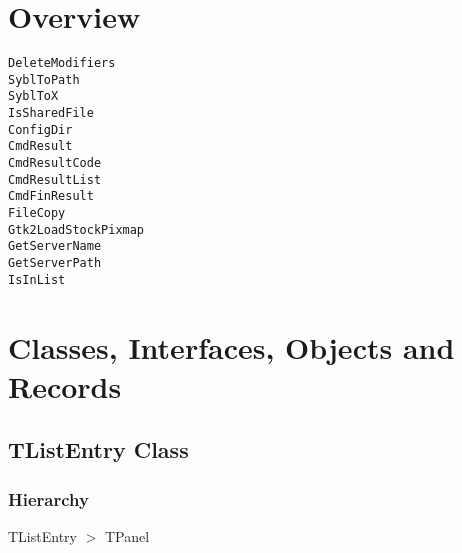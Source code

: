 \documentclass{report}
\newif\ifpdf
\begin{document}
\section{Overview}
\begin{description}
\item[\texttt{\begin{ttfamily}TListEntry\end{ttfamily} Class}]
\end{description}
\begin{description}
\item[\texttt{DeleteModifiers}]
\item[\texttt{SyblToPath}]
\item[\texttt{SyblToX}]
\item[\texttt{IsSharedFile}]
\item[\texttt{ConfigDir}]
\item[\texttt{CmdResult}]
\item[\texttt{CmdResultCode}]
\item[\texttt{CmdResultList}]
\item[\texttt{CmdFinResult}]
\item[\texttt{FileCopy}]
\item[\texttt{Gtk2LoadStockPixmap}]
\item[\texttt{GetServerName}]
\item[\texttt{GetServerPath}]
\item[\texttt{IsInList}]
\end{description}
\section{Classes, Interfaces, Objects and Records}
\ifpdf
\subsection*{\large{\textbf{TListEntry Class}}\normalsize\hspace{1ex}\hrulefill}
\else
\subsection*{TListEntry Class}
\fi
\label{utilities.TListEntry}
\subsubsection*{\large{\textbf{Hierarchy}}\normalsize\hspace{1ex}\hfill}
TListEntry {$>$} TPanel
\end{document}
